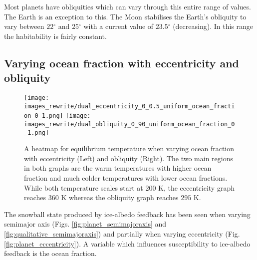 \documentclass[12pt, onecolumn]{revtex4-2}    %
\newcommand{\degrees}{\ensuremath{^{\circ}}}
\begin{document}
Most planets have obliquities which can vary through this entire range of values.
The Earth is an exception to this. 
The Moon stabilises the Earth's obliquity to vary between $22\degrees$ and $25\degrees$ with a current value of $23.5\degrees$ (decreasing).
In this range the habitability is fairly constant.


\subsection{Varying ocean fraction with eccentricity and obliquity} \label{ssec:qualitative_oceanfraction}
%
\begin{figure}[t]
  \texttt{[image: images\_rewrite/dual\_eccentricity\_0\_0.5\_uniform\_ocean\_fraction\_0\_1.png]}
  \texttt{[image: images\_rewrite/dual\_obliquity\_0\_90\_uniform\_ocean\_fraction\_0\_1.png]}
  \caption{
    A heatmap for equilibrium temperature when varying ocean fraction with eccentricity (Left) and obliquity (Right).
    The two main regions in both graphs are the warm temperatures with higher ocean fraction and much colder temperatures with lower ocean fractions.
    While both temperature scales start at $200$ K, the eccentricity graph reaches $360$ K whereas the obliquity graph reaches $295$ K.
  }
  \label{fig:qualitative_oceanfraction}
\end{figure}

The snowball state produced by ice-albedo feedback has been seen when varying semimajor axis (Figs. \ref{fig:planet_semimajoraxis} and \ref{fig:qualitative_semimajoraxis}) and partially when varying eccentricity (Fig. \ref{fig:planet_eccentricity}).
A variable which influences susceptibility to ice-albedo feedback is the ocean fraction.
\end{document}
